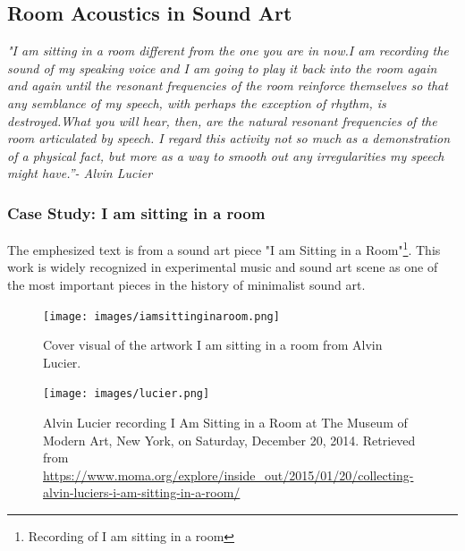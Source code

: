         \subsection{Room Acoustics in Sound Art}
            \emph{"I am sitting in a room different from the one you are in now.\newline I am recording the sound of my speaking voice and I am going to play it back into the room again and again until the resonant frequencies of the room reinforce themselves so that any semblance of my speech, with perhaps the exception of rhythm, is destroyed.\newline What you will hear, then, are the natural resonant frequencies of the room articulated by speech. I regard this activity not so much as a demonstration of a physical fact, but more as a way to smooth out any irregularities my speech might have.”\newline - Alvin Lucier\cite{Alvin_Lucier_I_am_Sitting_in_a_Room}}

            \subsubsection{Case Study: I am sitting in a room}
        
                The emphesized text is from a sound art piece "I am Sitting in a Room"\footnote{Recording of I am sitting in a room\cite{Bandcamp_Lucier}}. This work is widely recognized in experimental music and sound art scene as one of the most important pieces in the history of minimalist sound art\cite{Lucier_phd}.\par

                \begin{figure}[H]
                    \centering
                    \texttt{[image: images/iamsittinginaroom.png]}
                    \caption{Cover visual of the artwork I am sitting in a room from Alvin Lucier.}
                    \label{fig:IASIAR}
                \end{figure}

                \begin{figure}[H]
                    \centering
                    \texttt{[image: images/lucier.png]}
                    \caption{Alvin Lucier recording I Am Sitting in a Room at The Museum of Modern Art, New York, on Saturday, December 20, 2014. Retrieved from \url{https://www.moma.org/explore/inside_out/2015/01/20/collecting-alvin-luciers-i-am-sitting-in-a-room/}}
                    \label{fig:LUCIER}
                \end{figure}            

